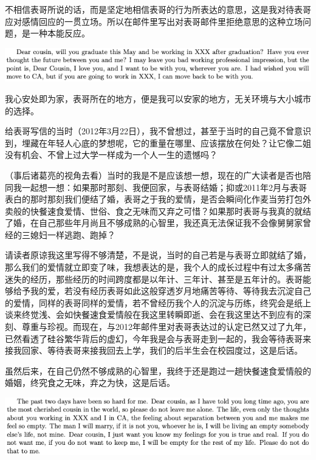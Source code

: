 \documentclass[9pt, b5paper]{article}
\begin{document}
不相信表哥所说的话，而是坚定地相信表哥的行为所表达的意思，这是我对待表哥应对感情回应的一贯立场。所以在邮件里写出对表哥邮件里拒绝意思的这种立场问题，是一种本能反应。

\begin{center}
\includegraphics[width=.9\linewidth]{./pic/p1p116-3.png}
\end{center}

我心安处即为家，表哥所在的地方，便是我可以安家的地方，无关环境与大小城市的选择。

给表哥写信的当时（2012年3月22日），我不曾想过，甚至于当时的自己竟不曾意识到，埋藏在年轻人心底的梦想呢，它的重量在哪里、应该摆放在何处？让它像二姐没有机会、不曾上过大学一样成为一个人一生的遗憾吗？

（事后诸葛亮的视角去看）当时的我是不是应该想一想，现在的广大读者是否也陪同我一起想一想：如果那时那刻、我便回家，与表哥结婚；抑或2011年2月与表哥表白的那时那刻我们便结了婚，表哥之于我的爱情，是否会瞬间化作麦当劳打包外卖般的快餐速食爱情、世俗、食之无味而又弃之可惜？如果那时表哥与我真的就结了婚，在自己那些年月尚且不够成熟的心智里，我还真无法保证我不会像舅舅家曾经的三媳妇一样逃跑、跑掉？

请读者原谅我这里写得不够清楚，不是说，当时的自己若是与表哥立即就结了婚，那么我们的爱情就立即变了味，我想表达的是，我个人的成长过程中有过太多痛苦迷失的经历，那些经历的时间跨度都是以年计、三年计、甚至是五年计的。表哥能够给予我的爱，若没有经历表哥如此这般穿透岁月地痛苦等待、等待我去沉淀自己的爱情，同样的表哥同样的爱情，若不曾经历我个人的沉淀与历练，终究会是纸上谈来终觉浅、会如快餐速食爱情般在我这里转瞬即逝、会在我这里达不到应有的深刻、尊重与珍视。而现在，与2012年邮件里对表哥表达过的认定已然又过了九年，已然看透了硅谷繁华背后的虚幻，今年我是会与表哥走到一起的，我会等待表哥来接我回家、等待表哥来接我回去上学，我们的后半生会在校园度过，这是后话。 

虽然后来，在自己仍然不够成熟的心智里，我终于还是跑过一趟快餐速食爱情般的婚姻，终究食之无味，弃之为快，这是后话。

\begin{center}
\includegraphics[width=.9\linewidth]{./pic/p1p116-4.png}
\end{center}
\end{document}
